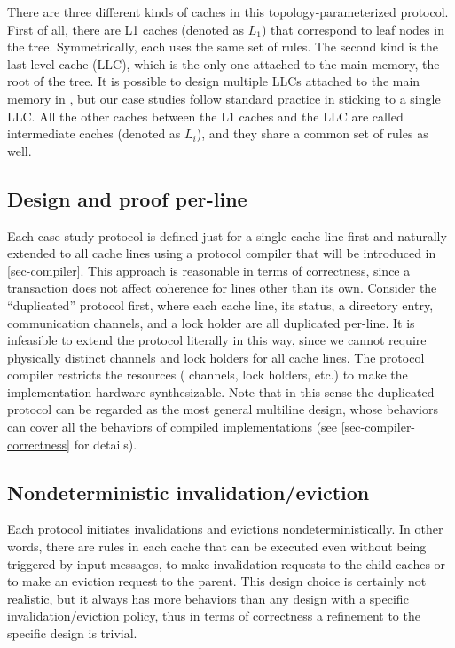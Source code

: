 There are three different kinds of caches in this topology-parameterized protocol.
First of all, there are L1 caches (denoted as $L_1$) that correspond to leaf nodes in the tree.
Symmetrically, each uses the same set of rules.
The second kind is the last-level cache (LLC), which is the only one attached to the main memory, the root of the tree.
It is possible to design multiple LLCs attached to the main memory in \hemiola{}, but our case studies follow standard practice in sticking to a single LLC.
All the other caches between the L1 caches and the LLC are called intermediate caches (denoted as $L_i$), and they share a common set of rules as well.

\subsection{Design and proof per-line}
\label{sec-design-line}

Each case-study protocol is defined just for a single cache line first and naturally extended to all cache lines using a protocol compiler that will be introduced in \autoref{sec-compiler}.
This approach is reasonable in terms of correctness, since a transaction does not affect coherence for lines other than its own.
Consider the ``duplicated'' protocol first, where each cache line, its status, a directory entry, communication channels, and a lock holder are all duplicated per-line.
It is infeasible to extend the protocol literally in this way, since we cannot require physically distinct channels and lock holders for all cache lines.
The protocol compiler restricts the resources (\eg{} channels, lock holders, etc.) to make the implementation hardware-synthesizable.
Note that in this sense the duplicated protocol can be regarded as the most general multiline design, whose behaviors can cover all the behaviors of compiled implementations (see \autoref{sec-compiler-correctness} for details).

\subsection{Nondeterministic invalidation/eviction}
\label{sec-nondet-inv-ev}

Each protocol initiates invalidations and evictions nondeterministically.
In other words, there are rules in each cache that can be executed even without being triggered by input messages, to make invalidation requests to the child caches or to make an eviction request to the parent.
This design choice is certainly not realistic, but it always has more behaviors than any design with a specific invalidation/eviction policy, thus in terms of correctness a refinement to the specific design is trivial.

